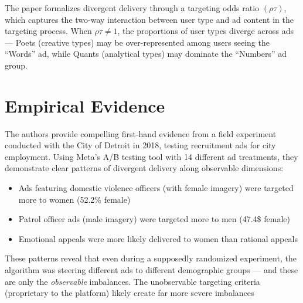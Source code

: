 \documentclass[10pt]{article}
\begin{document}
The paper formalizes divergent delivery through a targeting odds ratio $(\rho\tau) $, which captures the two-way interaction between user type and ad content in the targeting process. When $\rho\tau\neq 1 $, the proportions of user types diverge across ads --- Poets (creative types) may be over-represented among users seeing the ``Words'' ad, while Quants (analytical types) may dominate the ``Numbers'' ad group. 

\section{Empirical Evidence}
The authors provide compelling first-hand evidence from a field experiment conducted with the City of Detroit in 2018, testing recruitment ads for city employment. Using Meta's A/B testing tool with 14 different ad treatments, they demonstrate clear patterns of divergent delivery along observable dimensions: 
\begin{itemize}
    \item Ads featuring domestic violence officers (with female imagery) were targeted more to women (52.2\% female)
    \item Patrol officer ads (male imagery) were targeted more to men (47.4\$ female)
    \item Emotional appeals were more likely delivered to women than rational appeals  
\end{itemize}
These patterns reveal that even during a supposedly randomized experiment, the algorithm was steering different ads to different demographic groups --- and these are only the \textit{observable} imbalances. The unobservable targeting criteria (proprietary to the platform) likely create far more severe imbalances
\newpage 
\end{document}
